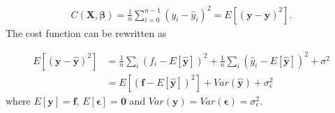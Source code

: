 \begin{align*}
C(\boldsymbol{X},\boldsymbol{\beta}) =\frac{1}{n}\sum_{i=0}^{n-1}(y_i-\hat{y}_i)^2= E\left[(\boldsymbol{y}-\boldsymbol{\hat{y}})^2\right].
\end{align*}
The cost function can be rewritten as

\begin{align*}
E\left[\left(\boldsymbol{y}-\boldsymbol{\hat{y}}\right)^2\right] &= \frac{1}{n}\sum_i\left(f_i- E\left[\boldsymbol{\hat{y}}\right]\right)^2+\frac{1}{n}\sum_i\left(\hat{y}_i- E\left[\boldsymbol{\hat{y}}\right]\right)^2+\sigma^2 \\
&= E\left[\left(\boldsymbol{f}-E\left[\boldsymbol{\hat{y}}\right]\right)^2\right] + Var\left(\boldsymbol{\hat{y}}\right) + \sigma_{\epsilon}^2
\end{align*}
where $E[\boldsymbol{y}] = \boldsymbol{f}$, $E\left[\boldsymbol{\epsilon}\right] = \boldsymbol{0}$ and $Var\left(\boldsymbol{y}\right) = Var \left(\boldsymbol{\epsilon}\right) = \sigma_{\epsilon}^2$.

